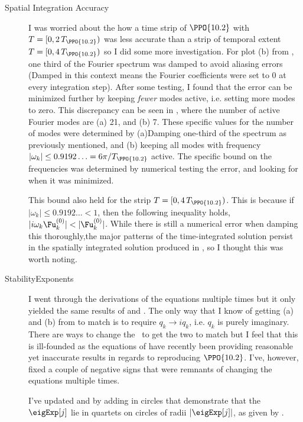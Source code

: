 \begin{description}
{\begin{description}
\item[Spatial Integration Accuracy]
I was worried about the how a time strip of $\PPO{10.2}$ with $T = [0,2\,T_{\PPO{10.2}})$ was less accurate than a strip of temporal
extent $T = [0,4\,T_{\PPO{10.2}})$ so I did some more investigation. For plot (b) from , one third of the Fourier spectrum was damped to avoid aliasing errors (Damped in this context means the Fourier coefficients were set to $0$ at every integration step). After some testing, I found that
the error can be minimized further by keeping \emph{fewer} modes active, i.e. setting more modes to zero. This discrepancy can be seen in , where the number of active Fourier modes are (a) 21, and (b) 7. These specific values for the
number of modes were determined by (a)Damping one-third of the spectrum as previously mentioned, and
(b) keeping all modes with frequency $| \omega_k | \leq 0.9192 \ldots = {6\pi}/{T_{\PPO{10.2}}} $ active. The specific bound on the frequencies was determined by numerical testing the error, and looking for when it was minimized.

This bound also held for the strip $T = [0,4\,T_{\PPO{10.2}})$. This is because if  $|\omega_k| \leq 0.9192 \ldots < 1 $, then the following inequality holds, $|i \omega_k \Fu_k^{(0)}| < |\Fu_k^{(0)}|$. While there is still a
numerical error when damping this thoroughly,the major patterns of the time-integrated solution persist in the spatially integrated solution produced in , so I thought this was worth noting.

\item[StabilityExponents]
I went through the derivations of the equations multiple times but it only yielded the same results of  and . The only way that I know of getting (a) and (b) from  to match is to require
$q_k \to i q_k$, i.e. $q_k$ is purely imaginary. There are ways to change the \stabmat\ to get the two to match but I feel that this is ill-founded as the equations of  have recently been
providing reasonable yet inaccurate results in regards to reproducing $\PPO{10.2}$. I've,
however, fixed a couple of negative signs that were remnants of changing the equations multiple times.

I've updated  and  by
adding in circles that demonstrate that the $\eigExp[j]$ lie in quartets
on circles of radii $|\eigExp[j]|$, as given by .


\end{description}}
\end{description}
